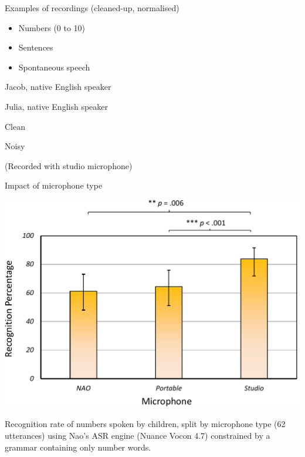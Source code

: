 \documentclass[compress]{beamer}
\begin{document}

\begin{frame}{Examples of recordings (cleaned-up, normalised)}

\begin{itemize}

\item Numbers (0 to 10)
\item Sentences
\item Spontaneous speech
\end{itemize}

Jacob, native English speaker

Julia, native English speaker

Clean

Noisy

(Recorded with studio microphone)

\end{frame}

\begin{frame}{Impact of microphone type}

    \begin{center}
        \includegraphics[width=0.8\linewidth]{mic_graph}
    \end{center}

Recognition rate of numbers spoken by children, split by microphone type
(62 utterances) using Nao's ASR engine (Nuance Vocon 4.7) constrained by
a grammar containing only number words.

\end{frame}
\end{document}

